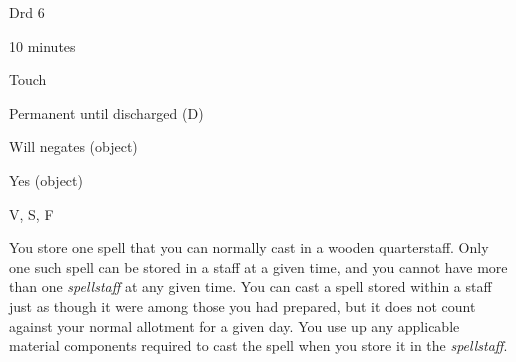 
\begin{description*}
\item[Level:] Drd 6
\item[Casting Time:] 10 minutes
\item[Range:] Touch
\item[Duration:] Permanent until discharged (D)
\item[Saving Throw:] Will negates (object)
\item[Spell Resistance:] Yes (object)
\item[Components:] V, S, F
\end{description*}

You store one spell that you can normally cast in a wooden quarterstaff. Only one
such spell can be stored in a staff at a given time, and you cannot have more than
one \textit{spellstaff} at any given time. You can cast a spell stored within a
staff just as though it were among those you had prepared, but it does not count
against your normal allotment for a given day. You use up any applicable material
components required to cast the spell when you store it in the \textit{spellstaff}.